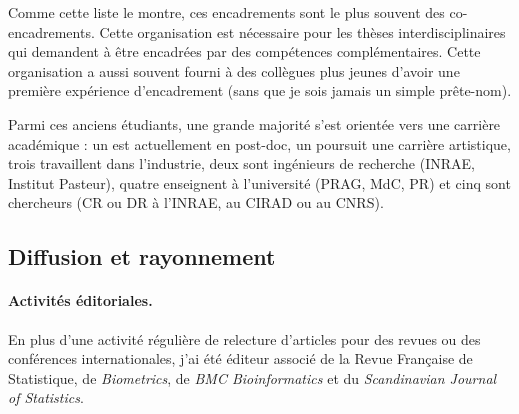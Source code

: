 Comme cette liste le montre, ces encadrements sont le plus souvent des co-encadrements. Cette organisation est nécessaire pour les thèses interdisciplinaires qui demandent à être encadrées par des compétences complémentaires. Cette organisation a aussi souvent fourni à des collègues plus jeunes d’avoir une première expérience d’encadrement (sans que je sois jamais un simple prête-nom). 

Parmi ces anciens étudiants, une grande majorité s’est orientée vers une carrière académique : un est actuellement en post-doc, un poursuit une carrière artistique, trois travaillent dans l’industrie, deux sont ingénieurs de recherche (INRAE, Institut Pasteur), quatre enseignent à l’université (PRAG, MdC, PR) et cinq sont chercheurs (CR ou DR à l’INRAE, au CIRAD ou au CNRS). 

\subsection{Diffusion et rayonnement}




\paragraph{Activités éditoriales.}
En plus  d'une activité régulière de relecture d'articles pour des revues ou
des conférences internationales, j'ai été éditeur associé de la Revue Française de Statistique, de {\sl Biometrics}, de {\sl BMC Bioinformatics} et du {\sl Scandinavian Journal of Statistics}. 

